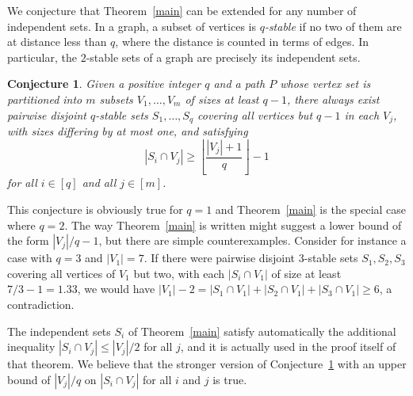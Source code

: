 \documentclass[12pt]{amsart}
\newtheorem{conjecture}{Conjecture}
\theoremstyle{remark}
\def\red{\color{red}}
\begin{document}
We conjecture that Theorem~\ref{main} can be extended for any number of independent sets. In a graph, a subset of vertices is {\em $q$-stable} if no two of them are at distance less than $q$, where the distance is counted in terms of edges. In particular, the $2$-stable sets of a graph are precisely its independent sets.

\begin{conjecture}\label{conj}
Given a positive integer $q$ and a path $P$ whose vertex set is partitioned into $m$ subsets $V_1,\ldots,V_m$ of sizes at least $q-1$,
there always exist pairwise disjoint $q$-stable sets $S_1,\ldots,S_q$ covering all vertices but $q-1$ in each $V_j$, with sizes differing by at most one, and satisfying
$$ |S_i\cap V_j|\geq \left\lfloor \frac{|V_j|+1} q\right\rfloor-1$$ for all $i\in[q]$ and all $j\in[m]$.
\end{conjecture}



 
This conjecture is obviously true for $q=1$ and Theorem~\ref{main} is the special case where $q=2$. The way Theorem~\ref{main} is written might suggest a lower bound of the form $|V_j|/q-1$, but there are simple counterexamples. Consider for instance a case with $q=3$ and $|V_1|=7$. If there were pairwise disjoint 3-stable sets $S_1,S_2,S_3$ covering all vertices of $V_1$ but two, with each $|S_i\cap V_1|$ of size at least $7/3-1=1.33$, we would have $|V_1|-2= |S_1\cap V_1|+|S_2\cap V_1|+|S_3\cap V_1|\geq 6$, a contradiction.

The independent sets $S_i$ of Theorem~\ref{main}  satisfy automatically the additional inequality $|S_i\cap V_j|\leq |V_j|/2$ for all $j$, and it is actually used in the proof itself of that theorem. 
We believe that the stronger version of Conjecture~\ref{conj} with an upper bound of $|V_j|/q$ on $|S_i\cap V_j|$ for all $i$ and $j$ is true. 
\end{document}
